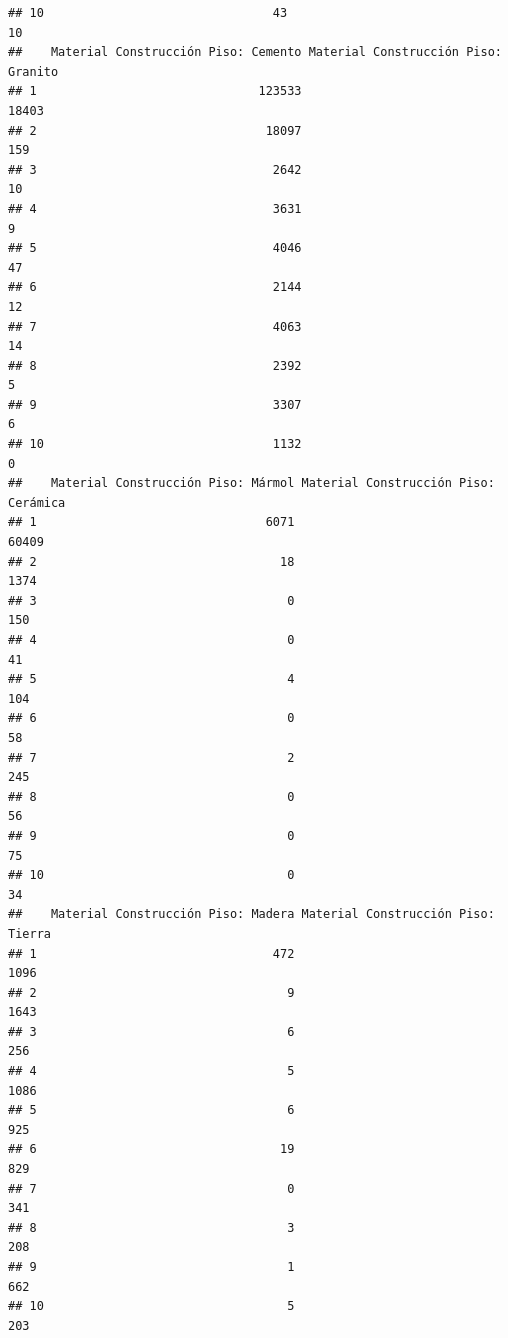 \documentclass[11pt,]{article}
\begin{document}
\begin{verbatim}
## 10                                43                                  10
##    Material Construcción Piso: Cemento Material Construcción Piso: Granito
## 1                               123533                               18403
## 2                                18097                                 159
## 3                                 2642                                  10
## 4                                 3631                                   9
## 5                                 4046                                  47
## 6                                 2144                                  12
## 7                                 4063                                  14
## 8                                 2392                                   5
## 9                                 3307                                   6
## 10                                1132                                   0
##    Material Construcción Piso: Mármol Material Construcción Piso: Cerámica
## 1                                6071                                60409
## 2                                  18                                 1374
## 3                                   0                                  150
## 4                                   0                                   41
## 5                                   4                                  104
## 6                                   0                                   58
## 7                                   2                                  245
## 8                                   0                                   56
## 9                                   0                                   75
## 10                                  0                                   34
##    Material Construcción Piso: Madera Material Construcción Piso: Tierra
## 1                                 472                               1096
## 2                                   9                               1643
## 3                                   6                                256
## 4                                   5                               1086
## 5                                   6                                925
## 6                                  19                                829
## 7                                   0                                341
## 8                                   3                                208
## 9                                   1                                662
## 10                                  5                                203

\end{verbatim}
\end{document}
